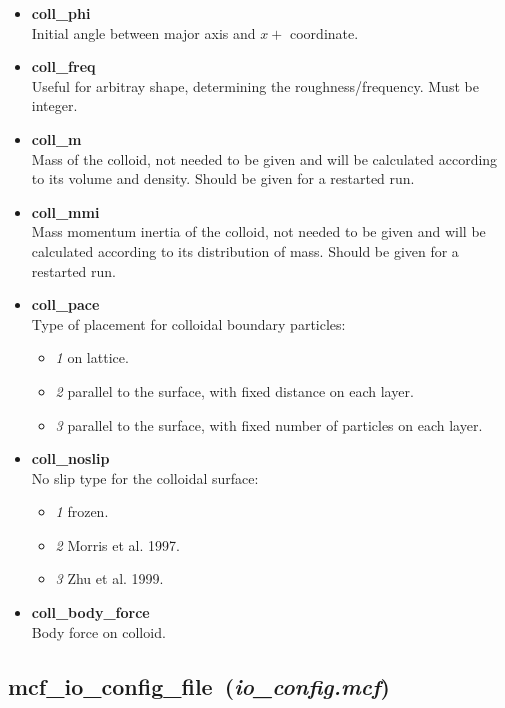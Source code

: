 \documentclass[a4paper,10pt]{article}
\begin{document}
\begin{itemize}
\item 
\textbf{coll\_phi} \\
Initial angle between major axis and $x+$ coordinate.

\item 
\textbf{coll\_freq} \\
Useful for arbitray shape, 
determining the roughness/frequency.
Must be integer.

\item 
\textbf{coll\_m} \\
Mass of the colloid, 
not needed to be given and
will be calculated according to its volume and density.
Should be given for a restarted run.

\item
\textbf{coll\_mmi} \\
Mass momentum inertia of the colloid, 
not needed to be given and 
will be calculated according to its distribution of mass.
Should be given for a restarted run.

\item
\textbf{coll\_pace} \\
Type of placement for colloidal boundary particles:
\begin{itemize}
\item
\textit{1} on lattice.
\item 
\textit{2} parallel to the surface, 
with fixed distance on each layer.
\item 
\textit{3} parallel to the surface,
with fixed number of particles on each layer.
\end{itemize}

\item
\textbf{coll\_noslip} \\
No slip type for the colloidal surface:
\begin{itemize}
\item
\textit{1} frozen.
\item 
\textit{2} Morris et al. 1997.
\item
\textit{3} Zhu et al. 1999.
\end{itemize}

\item 
\textbf{coll\_body\_force}  \\
Body force on colloid.

\end{itemize}

\subsection{\textbf{mcf\_io\_config\_file}~(\textit{io\_config.mcf})}
\end{document}
